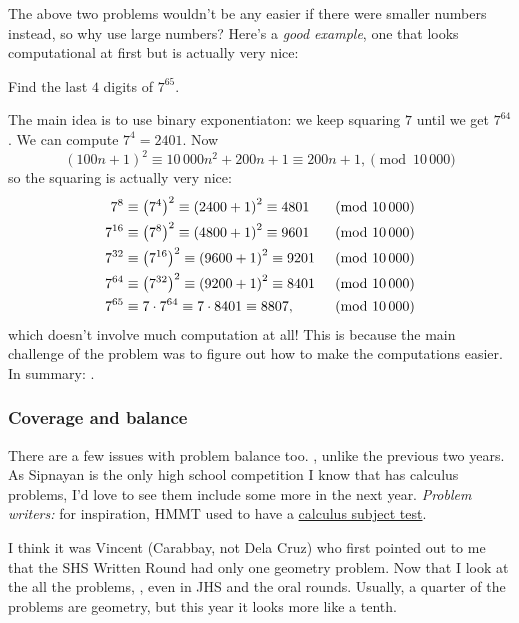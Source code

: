 \documentclass[11pt,paper=letter]{scrartcl}
\begin{document}
The above two problems wouldn't be any easier if there were smaller numbers instead, so why use large numbers? Here's a \emph{good example}, one that looks computational at first but is actually very nice:

\begin{probboxed}
   Find the last $4$ digits of $7^{65}$.
\end{probboxed}

The main idea is to use binary exponentiaton: we keep squaring $7$ until we get $7^{64}$. We can compute $7^4 = 2401$. Now
$$(100n + 1)^2 \equiv 10\,000n^2 + 200n + 1 \equiv 200n + 1, \pmod{10\,000}$$
so the squaring is actually very nice:
\begin{align*}
  7^8 &\equiv \left( 7^4 \right)^2 \equiv \left( 2400 + 1 \right)^2 \equiv 4801 & \pmod{10\,000} \\
  7^{16} &\equiv \left( 7^8 \right)^2 \equiv \left( 4800 + 1 \right)^2 \equiv 9601 & \pmod{10\,000} \\
  7^{32} &\equiv \left( 7^{16} \right)^2 \equiv \left( 9600 + 1 \right)^2 \equiv 9201 & \pmod{10\,000} \\
  7^{64} &\equiv \left( 7^{32} \right)^2 \equiv \left( 9200 + 1 \right)^2 \equiv 8401 & \pmod{10\,000} \\
  7^{65} &\equiv 7 \cdot 7^{64} \equiv 7 \cdot 8401 \equiv 8807, & \pmod{10\,000}
\end{align*}
which doesn't involve much computation at all! This is because the main challenge of the problem was to figure out how to make the computations easier. In summary: .

\subsubsection*{Coverage and balance}

There are a few issues with problem balance too. , unlike the previous two years. As Sipnayan is the only high school competition I know that has calculus problems, I'd love to see them include some more in the next year. \emph{Problem writers:} for inspiration, HMMT used to have a \href{https://www.hmmt.co/static/archive/february/problems/2010/pcalc10f.pdf}{calculus subject test}.

I think it was Vincent (Carabbay, not Dela Cruz) who first pointed out to me that the SHS Written Round had only one geometry problem. Now that I look at the all the problems, , even in JHS and the oral rounds. Usually, a quarter of the problems are geometry, but this year it looks more like a tenth.
\end{document}
